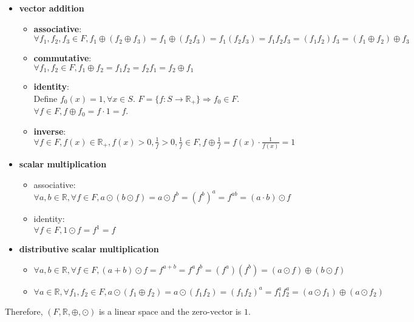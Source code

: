 \documentclass[a4paper,10.5pt]{article}
\newcommand{\R}{\mathbb{R}}
\begin{document}
\clearpage

\begin{itemize}
	\item \textbf{vector addition}
	\begin{itemize}
		\item \textbf{associative}: \\
		$\forall f_1, f_2, f_3 \in F, f_1 \oplus (f_2 \oplus f_3) = f_1 \oplus (f_2 f_3) = f_1 (f_2 f_3) = f_1 f_2 f_3 = (f_1 f_2) f_3 = (f_1 \oplus f_2 ) \oplus f_3$
		\item \textbf{commutative}: \\
		$\forall f_1, f_2 \in F, f_1 \oplus f_2 = f_1 f_2 = f_2 f_1 = f_2 \oplus f_1$
		\item \textbf{identity}: \\
		Define $f_0(x) = 1, \forall x \in S$. $F = \{f: S\rightarrow \R_+ \} \Rightarrow f_0 \in F$. \\
		$\forall f \in F, f \oplus f_0 = f \cdot 1 = f$.
		\item \textbf{inverse}: \\
		$\forall f \in F, f(x) \in \R_+, f(x) > 0, \frac{1}{f} > 0, \frac{1}{f} \in F, f \oplus \frac{1}{f} = f(x) \cdot \frac{1}{f(x)} = 1$
	\end{itemize}
	\item \bf{scalar multiplication}
	\begin{itemize}
		\item associative: \\
		$\forall a, b \in \R, \forall f \in F, a \odot (b \odot f) = a \odot f^b = (f^b)^a = f^{ab} = (a \cdot b) \odot f$
		\item identity: \\
		$\forall f \in F, 1 \odot f = f^1 = f$
	\end{itemize}
	\item \bf{distributive scalar multiplication}
	\begin{itemize}
		\item $\forall a, b \in \R, \forall f \in F, (a + b) \odot f = f^{a+b} = f^a f^b = (f^a) (f^b) = (a \odot f) \oplus (b \odot f)$
		\item $\forall a \in \R, \forall f_1, f_2 \in F, a \odot (f_1 \oplus f_2) = a \odot (f_1 f_2) = \left(f_1 f_2\right)^a = f_1^a f_2^a = (a \odot f_1) \oplus (a \odot f_2)$
	\end{itemize}
\end{itemize}
Therefore, $(F, \R, \oplus,\odot)$ is a linear space and the zero-vector is $1$. \\
\end{document}
